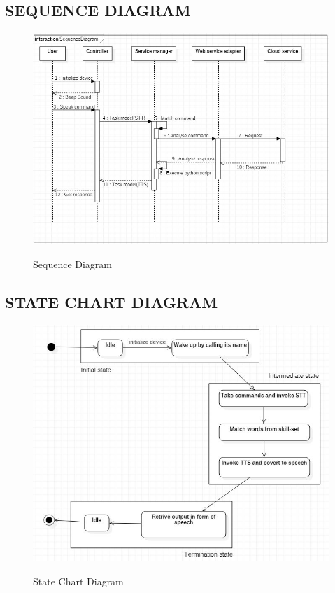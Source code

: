     \subsection*{SEQUENCE DIAGRAM}
    \begin{figure}[H]
  \centering
  \includegraphics[scale=0.65]{Sequence.JPG}\\
  \caption{Sequence Diagram}
\end{figure}
 \pagebreak   
 
    \subsection*{STATE CHART DIAGRAM}
    \begin{figure}[H]
  \centering
  \includegraphics[scale=0.7]{StateChart.JPG}\\
  \caption{State Chart Diagram}
\end{figure}
\pagebreak

